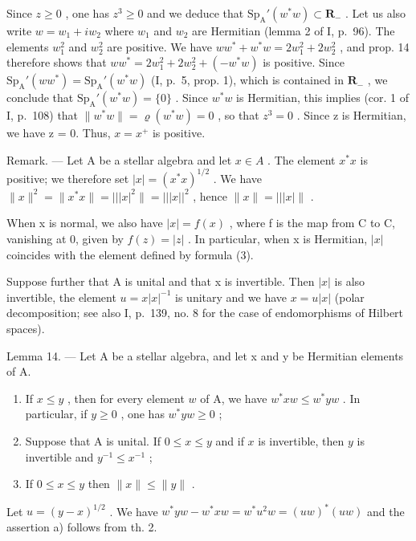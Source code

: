 Since \(z \geqslant 0\) , one has \(z^3 \geqslant 0\) and we deduce that \(\mathrm{Sp}_{\mathrm{A}}'(w^{*}w) \subset \mathbf{R}_{-}\) . Let us also write \(w = w_1 + iw_2\) where \(w_1\) and \(w_2\) are Hermitian (lemma 2 of I, p.~96). The elements \(w_1^2\) and \(w_2^2\) are positive. We have \(ww^{*} + w^{*}w = 2w_{1}^{2} + 2w_{2}^{2}\) , and prop. 14 therefore shows that \(ww^{*} = 2w_{1}^{2} + 2w_{2}^{2} + (-w^{*}w)\) is positive. Since \(\mathrm{Sp}_{\mathrm{A}}'(ww^{*}) = \mathrm{Sp}_{\mathrm{A}}'(w^{*}w)\) (I, p.~5, prop. 1), which is contained in \(\mathbf{R}_{-}\) , we conclude that \(\mathrm{Sp}_{\mathrm{A}}'(w^{*}w) = \{0\}\) . Since \(w^{*}w\) is Hermitian, this implies (cor. 1 of I, p.~108) that \(\|w^{*}w\| = \varrho(w^{*}w) = 0\) , so that \(z^{3} = 0\) . Since z is Hermitian, we have z = 0. Thus, \(x = x^{+}\) is positive.

Remark. --- Let A be a stellar algebra and let \(x \in A\) . The element \(x^{*}x\) is positive; we therefore set \(|x| = (x^{*}x)^{1/2}\) . We have \(\|x\|^{2} = \|x^{*}x\| = |||x|^{2}\| = |||x||^{2}\) , hence \(\|x\| = |||x|\|\) .

When x is normal, we also have \(|x| = f(x)\) , where f is the map from C to C, vanishing at 0, given by \(f(z) = |z|\) . In particular, when x is Hermitian, \(|x|\) coincides with the element defined by formula (3).

Suppose further that A is unital and that x is invertible. Then \(|x|\) is also invertible, the element \(u = x|x|^{-1}\) is unitary and we have \(x = u|x|\) (polar decomposition; see also I, p.~139, no. 8 for the case of endomorphisms of Hilbert spaces).

Lemma 14. --- Let A be a stellar algebra, and let x and y be Hermitian elements of A.

\begin{enumerate}
\def\labelenumi{\alph{enumi})}
\item
  If \(x \leqslant y\) , then for every element \(w\) of A, we have \(w^{*}xw \leqslant w^{*}yw\) . In particular, if \(y \geqslant 0\) , one has \(w^{*}yw \geqslant 0\) ;
\item
  Suppose that A is unital. If \(0 \leqslant x \leqslant y\) and if \(x\) is invertible, then \(y\) is invertible and \(y^{-1} \leqslant x^{-1}\) ;
\item
  If \(0 \leqslant x \leqslant y\) then \(\|x\| \leqslant \|y\|\) .
\end{enumerate}

Let \(u = (y - x)^{1/2}\) . We have \(w^{*}yw - w^{*}xw = w^{*}u^{2}w = (uw)^{*}(uw)\) and the assertion a) follows from th. 2.

